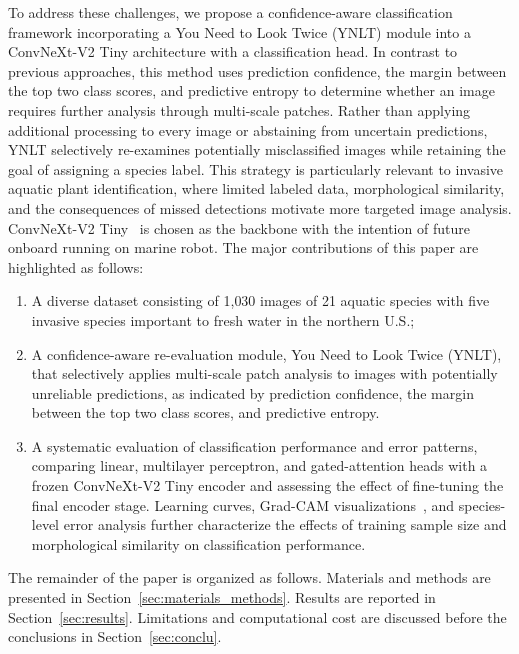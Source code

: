 \documentclass[final,3p,times,twocolumn]{elsarticle}
\begin{document}
To address these challenges, we propose a confidence-aware classification framework incorporating a You Need to Look Twice (YNLT) module into a ConvNeXt-V2 Tiny architecture with a classification head. In contrast to previous approaches, this method uses prediction confidence, the margin between the top two class scores, and predictive entropy to determine whether an image requires further analysis through multi-scale patches. Rather than applying additional processing to every image or abstaining from uncertain predictions, YNLT selectively re-examines potentially misclassified images while retaining the goal of assigning a species label. This strategy is particularly relevant to invasive aquatic plant identification, where limited labeled data, morphological similarity, and the consequences of missed detections motivate more targeted image analysis. ConvNeXt-V2 Tiny~\citep{liu2022convnet, Wooetal2023} is chosen as the backbone with the intention of future onboard running on marine robot. The major contributions of this paper
are highlighted as follows:
\begin{enumerate}
\item A diverse dataset consisting of 1{,}030 images of 21 aquatic species with five invasive species important to fresh water in the northern U.S.;

\item A confidence-aware re-evaluation module, You Need to Look Twice (YNLT), that selectively applies multi-scale patch analysis to images with potentially unreliable predictions, as indicated by prediction confidence, the margin between the top two class scores, and predictive entropy.

\item A systematic evaluation of classification performance and error patterns, comparing linear, multilayer perceptron, and gated-attention heads with a frozen ConvNeXt-V2 Tiny encoder and assessing the effect of fine-tuning the final encoder stage. Learning curves, Grad-CAM visualizations~\citep{selvaraju2017gradcam}, and species-level error analysis further characterize the effects of training sample size and morphological similarity on classification performance.
\end{enumerate}

The remainder of the paper is organized as follows. Materials and methods are presented in Section~\ref{sec:materials_methods}. Results are reported in Section~\ref{sec:results}. Limitations and computational cost are discussed before the conclusions in Section~\ref{sec:conclu}.
\end{document}
